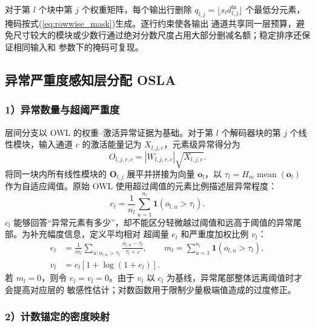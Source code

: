 \documentclass[UTF8,fontset=fandol]{ctexart}
\begin{document}
对于第 $l$ 个块中第 $j$ 个权重矩阵，每个输出行删除
$q_{l,j}=\lfloor s_l d_{l,j}^{\mathrm{in}}\rfloor$ 个最低分元素，掩码按式(\ref{eq:rowwise_mask})生成。逐行约束使各输出
通道共享同一层预算，避免尺寸较大的模块或少数行通过绝对分数尺度占用大部分删减名额；稳定排序还保证相同输入和
参数下的掩码可复现。

\subsection{异常严重度感知层分配 OSLA}

\subsubsection*{1）异常数量与超阈严重度}

层间分支以 OWL\cite{owl} 的权重--激活异常证据为基础。对于第 $l$ 个解码器块的第 $j$ 个线性模块，输入通道
$c$ 的激活能量记为 $X_{l,j,c}$，元素级异常得分为
\begin{equation}
O_{l,j,r,c}
=
\left|W_{l,j,r,c}\right|\sqrt{X_{l,j,c}} .
\label{eq:outlier}
\end{equation}
将同一块内所有线性模块的 $\bm O_{l,j}$ 展平并拼接为向量 $\bm o_l$，以
$\tau_l=H_m\operatorname{mean}(\bm o_l)$ 作为自适应阈值。原始 OWL 使用超过阈值的元素比例描述层异常程度：
\begin{equation}
c_l
=
\frac{1}{n_l}
\sum_{u=1}^{n_l}\mathbf 1(o_{l,u}>\tau_l).
\label{eq:count}
\end{equation}
$c_l$ 能够回答“异常元素有多少”，却不能区分轻微越过阈值和远高于阈值的异常尾部。为补充幅度信息，定义平均相对
超阈量 $e_l$ 和严重度加权比例 $v_l$：
\begin{equation}
\begin{aligned}
e_l&=
\frac{1}{m_l}
\sum_{u:o_{l,u}>\tau_l}
\frac{o_{l,u}-\tau_l}{\tau_l+\varepsilon},
\qquad
m_l=\sum_{u=1}^{n_l}\mathbf 1(o_{l,u}>\tau_l),\\
v_l&=c_l\left[1+\log(1+e_l)\right].
\end{aligned}
\label{eq:severity}
\end{equation}
若 $m_l=0$，则令 $e_l=v_l=0$。由于 $v_l$ 以 $c_l$ 为基线，异常尾部整体远离阈值时才会提高对应层的
敏感性估计；对数函数用于限制少量极端值造成的过度修正。

\subsubsection*{2）计数锚定的密度映射}
\end{document}
